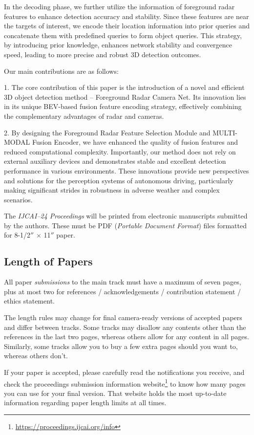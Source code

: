 \documentclass{article}
\begin{document}
In the decoding phase, we further utilize the information of foreground radar features to enhance detection accuracy and stability. Since these features are near the targets of interest, we encode their location information into prior queries and concatenate them with predefined queries to form object queries. This strategy, by introducing prior knowledge, enhances network stability and convergence speed, leading to more precise and robust 3D detection outcomes.

Our main contributions are as follows:

1. The core contribution of this paper is the introduction of a novel and efficient 3D object detection method – Foreground Radar Camera Net. Its innovation lies in its unique BEV-based fusion feature encoding strategy, effectively combining the complementary advantages of radar and cameras.


2. By designing the Foreground Radar Feature Selection Module and MULTI-MODAL Fusion Encoder, we have enhanced the quality of fusion features and reduced computational complexity. Importantly, our method does not rely on external auxiliary devices and demonstrates stable and excellent detection performance in various environments. These innovations provide new perspectives and solutions for the perception systems of autonomous driving, particularly making significant strides in robustness in adverse weather and complex scenarios.

The {\it IJCAI--24 Proceedings} will be printed from electronic
manuscripts submitted by the authors. These must be PDF ({\em Portable
        Document Format}) files formatted for 8-1/2$''$ $\times$ 11$''$ paper.

\subsection{Length of Papers}


All paper {\em submissions} to the main track must have a maximum of seven pages, plus at most two for references / acknowledgements / contribution statement / ethics statement.

The length rules may change for final camera-ready versions of accepted papers and
differ between tracks. Some tracks may disallow any contents other than the references in the last two pages, whereas others allow for any content in all pages. Similarly, some tracks allow you to buy a few extra pages should you want to, whereas others don't.

If your paper is accepted, please carefully read the notifications you receive, and check the proceedings submission information website\footnote{\url{https://proceedings.ijcai.org/info}} to know how many pages you can use for your final version. That website holds the most up-to-date information regarding paper length limits at all times.
\end{document}
